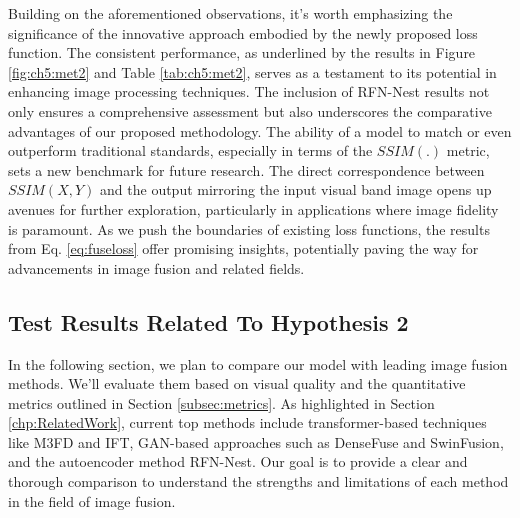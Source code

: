 Building on the aforementioned observations, it's worth emphasizing the significance of the innovative approach embodied by the newly proposed loss function. The consistent performance, as underlined by the results in Figure \ref{fig:ch5:met2} and Table \ref{tab:ch5:met2}, serves as a testament to its potential in enhancing image processing techniques. The inclusion of RFN-Nest results not only ensures a comprehensive assessment but also underscores the comparative advantages of our proposed methodology. The ability of a model to match or even outperform traditional standards, especially in terms of the \(SSIM(.)\) metric, sets a new benchmark for future research. The direct correspondence between \(SSIM(X,Y)\) and the output mirroring the input visual band image opens up avenues for further exploration, particularly in applications where image fidelity is paramount. As we push the boundaries of existing loss functions, the results from Eq. \ref{eq:fuseloss} offer promising insights, potentially paving the way for advancements in image fusion and related fields.

\subsection{Test Results Related To Hypothesis 2} \label{subsec:met9res}

In the following section, we plan to compare our model with leading image fusion methods. We'll evaluate them based on visual quality and the quantitative metrics outlined in Section \ref{subsec:metrics}. As highlighted in Section \ref{chp:RelatedWork}, current top methods include transformer-based techniques like M3FD\cite{liu2022target} and IFT\cite{vs2022image}, GAN-based approaches such as DenseFuse\cite{li2019infrared} and SwinFusion\cite{ma2022swinfusion}, and the autoencoder method RFN-Nest\cite{li2021rfn}. Our goal is to provide a clear and thorough comparison to understand the strengths and limitations of each method in the field of image fusion.

